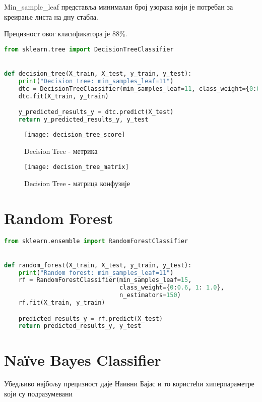 \documentclass[11pt]{article} %
\begin{document}
Min\_sample\_leaf представља минималан број узорака који је потребан за креирање листа на дну стабла.

Прецизност овог класификатора је 88\%.

\begin{lstlisting}[language=Python,title=Пример 5. ]
from sklearn.tree import DecisionTreeClassifier


def decision_tree(X_train, X_test, y_train, y_test):
    print("Decision tree: min_samples_leaf=11")
    dtc = DecisionTreeClassifier(min_samples_leaf=11, class_weight={0:0.8, 1: 1.0})
    dtc.fit(X_train, y_train)

    y_predicted_results_y = dtc.predict(X_test)
    return y_predicted_results_y, y_test
\end{lstlisting}

\begin{figure}[h]
\centering
	\texttt{[image: decision\_tree\_score]} 
	\caption{Decision Tree - метрика} 
\end{figure}

\newpage


\begin{figure}[h]
\centering
	\texttt{[image: decision\_tree\_matrix]} 
	\caption{Decision Tree - матрица конфузије} 
\end{figure}


\section{Random Forest}

\begin{lstlisting}[language=Python,title=Пример 6. ]
from sklearn.ensemble import RandomForestClassifier


def random_forest(X_train, X_test, y_train, y_test):
    print("Random forest: min_samples_leaf=11")
    rf = RandomForestClassifier(min_samples_leaf=15,
                                class_weight={0:0.6, 1: 1.0},
                                n_estimators=150)
    rf.fit(X_train, y_train)

    predicted_results_y = rf.predict(X_test)
    return predicted_results_y, y_test


\end{lstlisting}

\section{Naïve Bayes Classifier}
Убедљиво најбољу прецизност даје Наивни Бајас и то користећи хиперпараметре који су подразумевани
\end{document}
